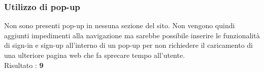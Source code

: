 \subsubsection{Utilizzo di pop-up}
Non sono presenti pop-up in nessuna sezione del sito. Non vengono quindi aggiunti
impedimenti alla navigazione ma sarebbe possibile inserire le funzionalità di
sign-in e sign-up all'interno di un pop-up per non richiedere il caricamento
di una ulteriore pagina web che fa sprecare tempo all'utente. \\
Risultato : \textbf{9}
